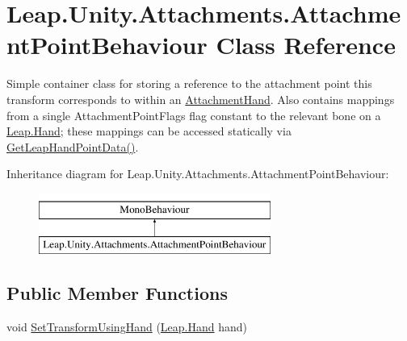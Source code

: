 \hypertarget{class_leap_1_1_unity_1_1_attachments_1_1_attachment_point_behaviour}{}\section{Leap.\+Unity.\+Attachments.\+Attachment\+Point\+Behaviour Class Reference}
\label{class_leap_1_1_unity_1_1_attachments_1_1_attachment_point_behaviour}


Simple container class for storing a reference to the attachment point this transform corresponds to within an \mbox{\hyperlink{class_leap_1_1_unity_1_1_attachments_1_1_attachment_hand}{Attachment\+Hand}}. Also contains mappings from a single Attachment\+Point\+Flags flag constant to the relevant bone on a \mbox{\hyperlink{class_leap_1_1_hand}{Leap.\+Hand}}; these mappings can be accessed statically via \mbox{\hyperlink{class_leap_1_1_unity_1_1_attachments_1_1_attachment_point_behaviour_a80f3e3a2fa250a6b955a50f471b4a498}{Get\+Leap\+Hand\+Point\+Data()}}.  


Inheritance diagram for Leap.\+Unity.\+Attachments.\+Attachment\+Point\+Behaviour\+:\begin{figure}[H]
\begin{center}
\leavevmode
\includegraphics[height=2.000000cm]{class_leap_1_1_unity_1_1_attachments_1_1_attachment_point_behaviour}
\end{center}
\end{figure}
\subsection*{Public Member Functions}
\begin{DoxyCompactItemize}
\item 
void \mbox{\hyperlink{class_leap_1_1_unity_1_1_attachments_1_1_attachment_point_behaviour_a14331ba6656c65a7b30134517126c776}{Set\+Transform\+Using\+Hand}} (\mbox{\hyperlink{class_leap_1_1_hand}{Leap.\+Hand}} hand)
\end{DoxyCompactItemize}
